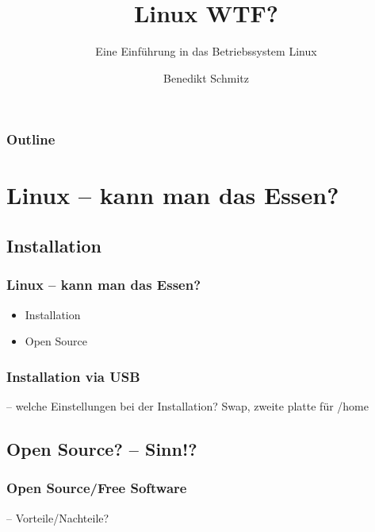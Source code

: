 \documentclass{beamer}
\begin{document}
\title{Linux WTF?}
\subtitle{Eine Einführung in das Betriebssystem Linux}
\author{Benedikt Schmitz}
\date{}



	\begin{frame}[plain]
	  \titlepage
	\end{frame}
	\begin{frame}
  		\frametitle{Outline}
		\tableofcontents
	\end{frame}
	\section{Linux -- kann man das Essen?}
	    \subsection{Installation}
	        \begin{frame}
          		\frametitle{Linux -- kann man das Essen?}
            		\begin{center}
                		\begin{minipage}{0.44\textwidth}
                		    \begin{itemize}
                		        \item Installation
                		        \item Open Source
                		    \end{itemize}
                		\end{minipage}%
            		\end{center}
        	\end{frame}
        	
	        \begin{frame}
          		\frametitle{Installation via USB}
          		-- welche Einstellungen bei der Installation? Swap, zweite platte für /home
        		\begin{minipage}{0.44\textwidth}
        		
        		\end{minipage}%
        		\begin{minipage}{0.54\textwidth}
        		
        		\end{minipage}
        	\end{frame}
        	
	    \subsection{Open Source? -- Sinn!?}
	        \begin{frame}
          		\frametitle{Open Source/Free Software}
          		-- Vorteile/Nachteile?
        		\begin{minipage}{0.44\textwidth}
        		
        		\end{minipage}%
        		\begin{minipage}{0.54\textwidth}
        		
        		\end{minipage}
        	\end{frame}
        	
\end{document}
